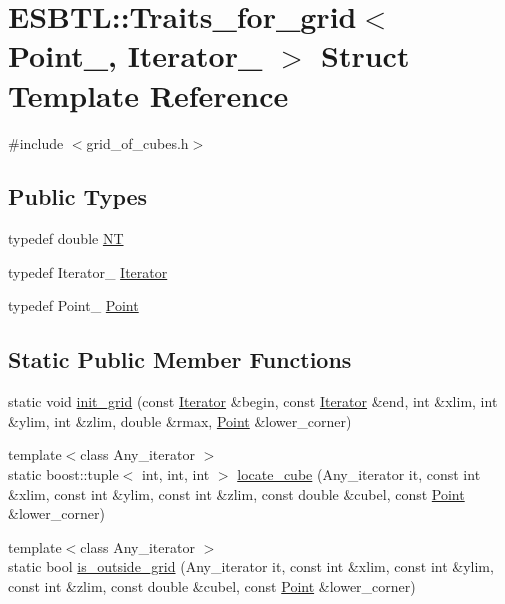 \hypertarget{structESBTL_1_1Traits__for__grid}{}\section{E\+S\+B\+TL\+:\+:Traits\+\_\+for\+\_\+grid$<$ Point\+\_\+, Iterator\+\_\+ $>$ Struct Template Reference}
\label{structESBTL_1_1Traits__for__grid}


{\ttfamily \#include $<$grid\+\_\+of\+\_\+cubes.\+h$>$}

\subsection*{Public Types}
\begin{DoxyCompactItemize}
\item 
typedef double \hyperlink{structESBTL_1_1Traits__for__grid_a2d1eddf80f02f912cd39b58c9356dd83}{NT}
\item 
typedef Iterator\+\_\+ \hyperlink{structESBTL_1_1Traits__for__grid_af8465e0f6ef165f72a3ca602e5b17445}{Iterator}
\item 
typedef Point\+\_\+ \hyperlink{structESBTL_1_1Traits__for__grid_a9e1fa4c89963d77117ce5eaead5ce7a1}{Point}
\end{DoxyCompactItemize}
\subsection*{Static Public Member Functions}
\begin{DoxyCompactItemize}
\item 
static void \hyperlink{structESBTL_1_1Traits__for__grid_a6456ed3dd1cba28aa5081f4fd2270880}{init\+\_\+grid} (const \hyperlink{structESBTL_1_1Traits__for__grid_af8465e0f6ef165f72a3ca602e5b17445}{Iterator} \&begin, const \hyperlink{structESBTL_1_1Traits__for__grid_af8465e0f6ef165f72a3ca602e5b17445}{Iterator} \&end, int \&xlim, int \&ylim, int \&zlim, double \&rmax, \hyperlink{structESBTL_1_1Traits__for__grid_a9e1fa4c89963d77117ce5eaead5ce7a1}{Point} \&lower\+\_\+corner)
\item 
{\footnotesize template$<$class Any\+\_\+iterator $>$ }\\static boost\+::tuple$<$ int, int, int $>$ \hyperlink{structESBTL_1_1Traits__for__grid_ace6769e2b498f72a9bd02df769299df2}{locate\+\_\+cube} (Any\+\_\+iterator it, const int \&xlim, const int \&ylim, const int \&zlim, const double \&cubel, const \hyperlink{structESBTL_1_1Traits__for__grid_a9e1fa4c89963d77117ce5eaead5ce7a1}{Point} \&lower\+\_\+corner)
\item 
{\footnotesize template$<$class Any\+\_\+iterator $>$ }\\static bool \hyperlink{structESBTL_1_1Traits__for__grid_ab937229626216c683d664c6441020185}{is\+\_\+outside\+\_\+grid} (Any\+\_\+iterator it, const int \&xlim, const int \&ylim, const int \&zlim, const double \&cubel, const \hyperlink{structESBTL_1_1Traits__for__grid_a9e1fa4c89963d77117ce5eaead5ce7a1}{Point} \&lower\+\_\+corner)
\end{DoxyCompactItemize}


